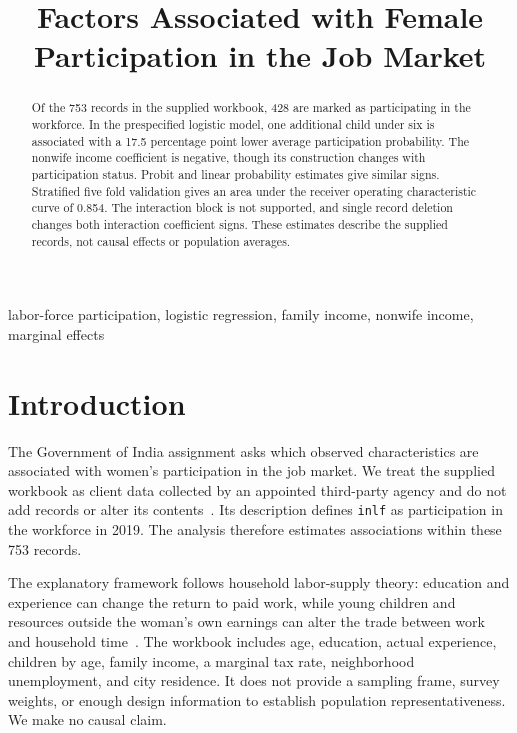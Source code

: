 \documentclass[conference]{IEEEtran}
\begin{document}
\title{Factors Associated with Female Participation in the Job Market}

\author{
}

\maketitle

\begin{abstract}
Of the 753 records in the supplied workbook, 428 are marked as participating in the workforce. In the prespecified logistic model, one additional child under six is associated with a 17.5 percentage point lower average participation probability. The nonwife income coefficient is negative, though its construction changes with participation status. Probit and linear probability estimates give similar signs. Stratified five fold validation gives an area under the receiver operating characteristic curve of 0.854. The interaction block is not supported, and single record deletion changes both interaction coefficient signs. These estimates describe the supplied records, not causal effects or population averages.
\end{abstract}

\begin{IEEEkeywords}
labor-force participation, logistic regression, family income, nonwife income, marginal effects
\end{IEEEkeywords}

\section{Introduction}
The Government of India assignment asks which observed characteristics are associated with women's participation in the job market. We treat the supplied workbook as client data collected by an appointed third-party agency and do not add records or alter its contents~\cite{task,data}. Its description defines \texttt{inlf} as participation in the workforce in 2019. The analysis therefore estimates associations within these 753 records.

The explanatory framework follows household labor-supply theory: education and experience can change the return to paid work, while young children and resources outside the woman's own earnings can alter the trade between work and household time~\cite{becker,mroz}. The workbook includes age, education, actual experience, children by age, family income, a marginal tax rate, neighborhood unemployment, and city residence. It does not provide a sampling frame, survey weights, or enough design information to establish population representativeness. We make no causal claim.
\end{document}
